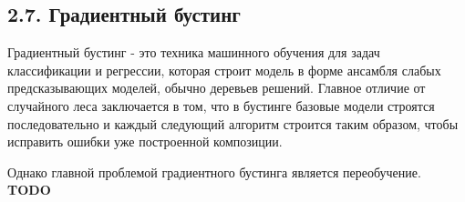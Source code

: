 \subsection{2.7. Градиентный бустинг}

Градиентный бустинг \cite{gradient boosting}- это техника машинного обучения для задач классификации и регрессии, которая строит модель в форме ансамбля слабых предсказывающих моделей, обычно деревьев решений. Главное отличие от случайного леса заключается в том, что в бустинге базовые модели строятся последовательно и каждый следующий алгоритм строится таким образом, чтобы исправить ошибки уже построенной композиции.

Однако главной проблемой градиентного бустинга является переобучение. \textbf{TODO}



\clearpage






